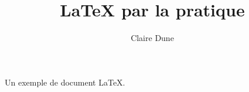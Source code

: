 \documentclass[10pt,a4paper]{article}
\author{Claire Dune}
\title{LaTeX par la pratique}
\begin{document}
 Un exemple de document \LaTeX.
\end{document}
